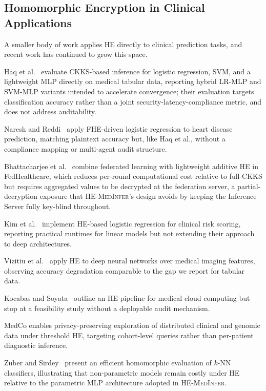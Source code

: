 \documentclass[journal,compsoc]{IEEEtran}
\newcommand{\framework}{\textsc{HE-MedInfer}}
\begin{document}
\subsection{Homomorphic Encryption in Clinical Applications}

A smaller body of work applies HE directly to clinical prediction tasks, and
recent work has continued to grow this space.

Haq et
al.~\cite{haq2025tabular} evaluate CKKS-based inference for logistic
regression, SVM, and a lightweight MLP directly on medical tabular data,
reporting hybrid LR-MLP and SVM-MLP variants intended to accelerate
convergence; their evaluation targets classification accuracy rather than a
joint security-latency-compliance metric, and does not address auditability.

Naresh and Reddi~\cite{naresh2025heart} apply FHE-driven logistic regression
to heart disease prediction, matching plaintext accuracy but, like Haq et
al., without a compliance mapping or multi-agent audit structure.

Bhattacharjee et al.~\cite{bhattacharjee2025fedhealthcare} combine federated
learning with lightweight additive HE in FedHealthcare, which reduces
per-round computational cost relative to full CKKS but requires aggregated
values to be decrypted at the federation server, a partial-decryption
exposure that \framework{}'s design avoids by keeping the Inference Server
fully key-blind throughout.

Kim et al.~\cite{kim2018logreg} implement HE-based logistic regression for
clinical risk scoring, reporting practical runtimes for linear models but not
extending their approach to deep architectures.

Vizitiu et
al.~\cite{vizitiu2020applying} apply HE to deep neural networks over medical
imaging features, observing accuracy degradation comparable to the gap we
report for tabular data.

Kocabas and Soyata~\cite{kocabas2015medcloud}
outline an HE pipeline for medical cloud computing but stop at a feasibility
study without a deployable audit mechanism.

MedCo
\cite{raisaro2018medco} enables privacy-preserving exploration of distributed
clinical and genomic data under threshold HE, targeting cohort-level queries
rather than per-patient diagnostic inference.

Zuber and
Sirdey~\cite{zuber2021heknn} present an efficient homomorphic evaluation of
$k$-NN classifiers, illustrating that non-parametric models remain costly
under HE relative to the parametric MLP architecture adopted in \framework{}.
\end{document}
